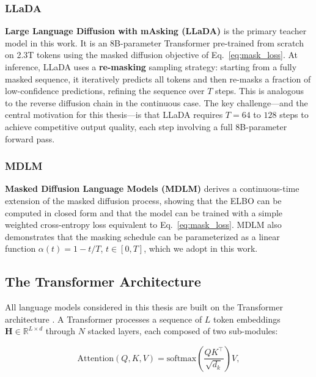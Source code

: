 \documentclass[11pt, a4paper]{article}
\begin{document}
\subsubsection{LLaDA}
\label{subsubsec:llada}

\textbf{Large Language Diffusion with mAsking (LLaDA)} \cite{nie2025llada} is the primary
teacher model in this work. It is an 8B-parameter Transformer pre-trained from scratch on
2.3T tokens using the masked diffusion objective of Eq.~\eqref{eq:mask_loss}. At inference,
LLaDA uses a \textbf{re-masking} sampling strategy: starting from a fully masked sequence,
it iteratively predicts all tokens and then re-masks a fraction of low-confidence predictions,
refining the sequence over $T$ steps. This is analogous to the reverse diffusion chain in the
continuous case. The key challenge---and the central motivation for this thesis---is that
LLaDA requires $T = 64$ to $128$ steps to achieve competitive output quality, each step
involving a full 8B-parameter forward pass.

\subsubsection{MDLM}
\label{subsubsec:mdlm}

\textbf{Masked Diffusion Language Models (MDLM)} \cite{sahoo2024mdlm} derives a continuous-time
extension of the masked diffusion process, showing that the ELBO can be computed in closed
form and that the model can be trained with a simple weighted cross-entropy loss equivalent
to Eq.~\eqref{eq:mask_loss}. MDLM also demonstrates that the masking schedule can be
parameterized as a linear function $\alpha(t) = 1 - t/T$, $t \in [0, T]$, which we adopt
in this work.

\subsection{The Transformer Architecture}
\label{subsec:transformer}

All language models considered in this thesis are built on the Transformer architecture
\cite{vaswani2017attention}. A Transformer processes a sequence of $L$ token embeddings
$\mathbf{H} \in \mathbb{R}^{L \times d}$ through $N$ stacked layers, each composed of two
sub-modules:

\begin{equation}
    \text{Attention}(Q, K, V) = \text{softmax}\!\left(\frac{QK^\top}{\sqrt{d_k}}\right)V,
    \label{eq:attention}
\end{equation}
\end{document}
